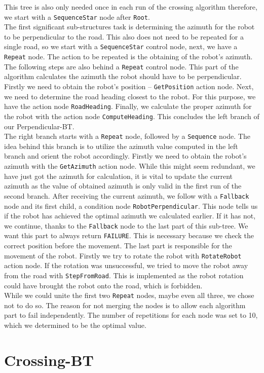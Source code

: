     This tree is also only needed once in each run of the crossing algorithm therefore, we start with a \texttt{SequenceStar} node after \texttt{Root}.\\
    The first significant sub-structures task is determining the azimuth for the robot to be perpendicular to the road. This also does not need to be repeated for a single road, so we start with a \texttt{SequenceStar} control node, next, we have a \texttt{Repeat} node. The action to be repeated is the obtaining of the robot's azimuth. The following steps are also behind a \texttt{Repeat} control node. This part of the algorithm calculates the azimuth the robot should have to be perpendicular. Firstly we need to obtain the robot's position -- \texttt{GetPosition} action node. Next, we need to determine the road heading closest to the robot. For this purpose, we have the action node \texttt{RoadHeading}. Finally, we calculate the proper azimuth for the robot with the action node \texttt{ComputeHeading}. This concludes the left branch of our Perpendicular-BT.\\
    The right branch starts with a \texttt{Repeat} node, followed by a \texttt{Sequence} node. The idea behind this branch is to utilize the azimuth value computed in the left branch and orient the robot accordingly. Firstly we need to obtain the robot's azimuth with the \texttt{GetAzimuth} action node. While this might seem redundant, we have just got the azimuth for calculation, it is vital to update the current azimuth as the value of obtained azimuth is only valid in the first run of the second branch. After receiving the current azimuth, we follow with a \texttt{Fallback} node and its first child, a condition node \texttt{RobotPerpendicular}. This node tells us if the robot has achieved the optimal azimuth we calculated earlier. If it has not, we continue, thanks to the \texttt{Fallback} node to the last part of this sub-tree. We want this part to always return \texttt{FAILURE}. This is necessary because we check the correct position before the movement. The last part is responsible for the movement of the robot. Firstly we try to rotate the robot with \texttt{RotateRobot} action node. If the rotation was unsuccessful, we tried to move the robot away from the road with \texttt{StepFromRoad}. This is implemented as the robot rotation could have brought the robot onto the road, which is forbidden.\\
    While we could unite the first two \texttt{Repeat} nodes, maybe even all three, we chose not to do so. The reason for not merging the nodes is to allow each algorithm part to fail independently. The number of repetitions for each node was set to 10, which we determined to be the optimal value.

\section{Crossing-BT}
\label{sec:Crossing-BT}
